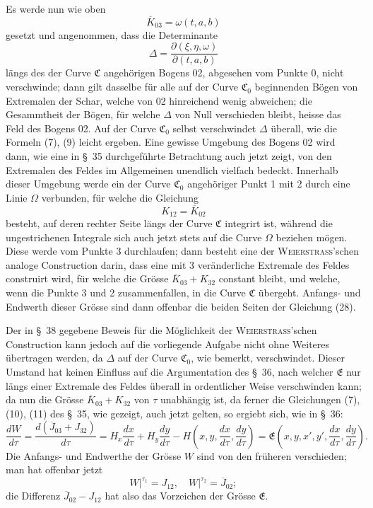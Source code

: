 \documentclass[11pt,a4paper,leqno]{article}
\begin{document}
Es werde nun wie oben
\[
\overline{K}_{03}=\omega(t,a,b)
\]
gesetzt und angenommen, dass die Determinante
\[
\Delta=\frac{\partial(\xi,\eta,\omega)}{\partial(t,a,b)}
\]
längs des der Curve $\mathfrak{C}$ angehörigen Bogens 02, abgesehen vom Punkte 0, nicht verschwinde; dann gilt dasselbe für alle auf der Curve $\mathfrak{C}_0$ beginnenden Bögen von Extremalen der Schar, welche von 02 hinreichend wenig abweichen; die Gesammtheit der Bögen, für welche $\Delta$ von Null verschieden bleibt, heisse das Feld des Bogens 02. Auf der Curve $\mathfrak{C}_0$ selbst verschwindet $\Delta$ überall, wie die Formeln (7), (9) leicht ergeben. Eine gewisse Umgebung des Bogens 02 wird dann, wie eine in \S~35 durchgeführte Betrachtung auch jetzt zeigt, von den Extremalen des Feldes im Allgemeinen unendlich vielfach bedeckt. Innerhalb dieser Umgebung werde ein der Curve $\mathfrak{C}_0$ angehöriger Punkt 1 mit 2 durch eine Linie $\Omega$ verbunden, für welche die Gleichung
\begin{equation}\tag{28}
K_{12}=\overline{K}_{02}
\end{equation}
besteht, auf deren rechter Seite längs der Curve $\mathfrak{C}$ integrirt ist, während die ungestrichenen Integrale sich auch jetzt stets auf die Curve $\Omega$ beziehen mögen. Diese werde vom Punkte 3 durchlaufen; dann besteht eine der \textsc{Weierstrass}'schen analoge Construction darin, dass eine mit 3 veränderliche Extremale des Feldes construirt wird, für welche die Grösse $\overline{K}_{03}+K_{32}$ constant bleibt, und welche, wenn die Punkte 3 und 2 zusammenfallen, in die Curve $\mathfrak{C}$ übergeht. Anfangs- und Endwerth dieser Grösse sind dann offenbar die beiden Seiten der Gleichung (28).

Der in \S~38 gegebene Beweis für die Möglichkeit der \textsc{Weierstrass}'schen Construction kann jedoch auf die vorliegende Aufgabe nicht ohne Weiteres übertragen werden, da $\Delta$ auf der Curve $\mathfrak{C}_0$, wie bemerkt, verschwindet. Dieser Umstand hat keinen Einfluss auf die Argumentation des \S~36, nach welcher $\mathfrak{E}$ nur längs einer Extremale des Feldes überall in ordentlicher Weise verschwinden kann; da nun die Grösse $\overline{K}_{03}+K_{32}$ von $\tau$ unabhängig ist, da ferner die Gleichungen (7), (10), (11) des \S~35, wie gezeigt, auch jetzt gelten, so ergiebt sich, wie in \S~36:
\[
\frac{dW}{d\tau}=\frac{d(\overline{J}_{03}+J_{32})}{d\tau}
=H_x\frac{dx}{d\tau}+H_y\frac{dy}{d\tau}-H\left(x,y,\frac{dx}{d\tau},\frac{dy}{d\tau}\right)
=\mathfrak{E}\left(x,y,x',y',\frac{dx}{d\tau},\frac{dy}{d\tau}\right).
\]
Die Anfangs- und Endwerthe der Grösse $W$ sind von den früheren verschieden; man hat offenbar jetzt
\[
\left.W\right|^{\tau_1}=J_{12},\quad \left.W\right|^{\tau_2}=\overline{J}_{02};
\]
die Differenz $\overline{J}_{02}-J_{12}$ hat also das Vorzeichen der Grösse $\mathfrak{E}$.
\end{document}
